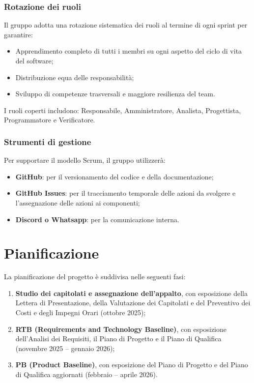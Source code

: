 \documentclass[11pt,a4paper]{article}
\begin{document}
\subsubsection{Rotazione dei ruoli}
Il gruppo adotta una rotazione sistematica dei ruoli al termine di ogni sprint per garantire:
\begin{itemize}
    \item Apprendimento completo di tutti i membri su ogni aspetto del ciclo di vita del software;
    \item Distribuzione equa delle responsabilità;
    \item Sviluppo di competenze trasversali e maggiore resilienza del team.
\end{itemize}
I ruoli coperti includono: Responsabile, Amministratore, Analista, Progettista, Programmatore e Verificatore.

\subsubsection{Strumenti di gestione}
Per supportare il modello Scrum, il gruppo utilizzerà:
\begin{itemize}
    \item \textbf{GitHub}: per il versionamento del codice e della documentazione;
    \item \textbf{GitHub Issues}: per il tracciamento temporale delle azioni da svolgere e l'assegnazione delle azioni ai componenti;
    \item \textbf{Discord o Whatsapp}: per la comunicazione interna.
\end{itemize}

\newpage

\section{Pianificazione}
La pianificazione del progetto è suddivisa nelle seguenti fasi:
\begin{enumerate}
    \item \textbf{Studio dei capitolati e assegnazione dell’appalto}, con esposizione della Lettera di Presentazione, della Valutazione dei Capitolati e del Preventivo dei Costi e degli Impegni Orari (ottobre 2025);
    \item \textbf{RTB (Requirements and Technology Baseline)}, con esposizione dell'Analisi dei Requisiti, il Piano di Progetto e il Piano di Qualifica (novembre 2025 – gennaio 2026);
    \item \textbf{PB (Product Baseline)}, con esposizione del Piano di Progetto e del Piano di Qualifica aggiornati (febbraio – aprile 2026).
\end{enumerate}
\end{document}
